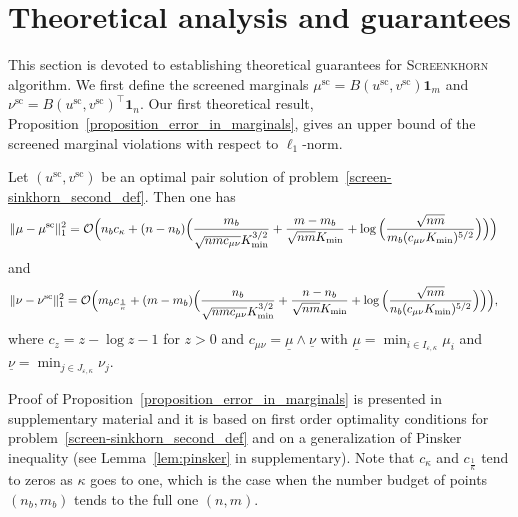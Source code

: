 
\section{Theoretical analysis and guarantees} %
\label{sec:analysis_of_marginal_violations}

This section is devoted to establishing theoretical guarantees for \textsc{Screenkhorn} algorithm. %
We first define the screened marginals $\mu^{\text{sc}} = B(u^{\text{sc}}, v^{\text{sc}}) \mathbf 1_m$ and $\nu^{\text{sc}} = B(u^{\text{sc}}, v^{\text{sc}})^\top \mathbf 1_n.$ 
Our first theoretical result, Proposition~\ref{proposition_error_in_marginals}, gives an upper bound of the screened marginal violations with respect to $\ell_1$-norm.

\begin{proposition}
\label{proposition_error_in_marginals}
Let $(u^{\text{sc}}, v^{\text{sc}})$ be an optimal pair solution of problem~\eqref{screen-sinkhorn_second_def}.
Then one has 
\begin{align}
\label{marginal-error-mu}
{\|{\mu} -{\mu}^{\text{sc}}\|^2_1} = \mathcal{O}\Big(n_bc_\kappa + (n- n_b) \Big(\frac{m_b}{\sqrt{nmc_{\mu\nu}}K_{\min}^{3/2}} &+ \frac{m-m_b}{\sqrt{nm}K_{\min}}
 + \log\Big(\frac{\sqrt{nm}}{m_b(c_{\mu\nu}K_{\min})^{5/2}} 
\Big)\Big)\Big)
\end{align}
and 
\begin{align}
\label{marginal-error-nu}
{\|{\nu} -{\nu}^{\text{sc}}\|^2_1} = \mathcal{O}\Big(m_bc_{\frac1\kappa} + (m- m_b) \Big(\frac{n_b}{\sqrt{nmc_{\mu\nu}}K_{\min}^{3/2}} &+ \frac{n-n_b}{\sqrt{nm}K_{\min}}
 + \log\Big(\frac{\sqrt{nm}}{n_b (c_{\mu\nu}K_{\min})^{5/2}}
\Big)\Big)\Big),
\end{align}
where $c_z = z - \log z - 1$ for $z>0$ and $c_{\mu\nu} = \underline{\mu}\wedge \underline{\nu}$ with $\underline{\mu} = \min_{i\in I_{\varepsilon,\kappa}}\mu_i$ and $\underline{\nu} = \min_{j\in J_{\varepsilon,\kappa}}\nu_j$.

\end{proposition}
Proof of Proposition~\ref{proposition_error_in_marginals} is presented in supplementary material and it is based on first order optimality conditions for problem~\eqref{screen-sinkhorn_second_def} and on a generalization of Pinsker inequality (see Lemma~\ref{lem:pinsker} in supplementary).
Note that $c_\kappa$ and $c_{\frac 1\kappa}$ tend to zeros as $\kappa$ goes to one, which is the case when the number budget of points $(n_b,m_b)$ tends to the full one $(n,m)$.

